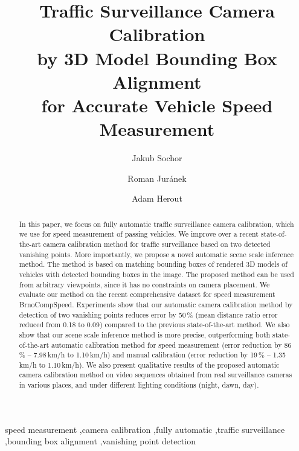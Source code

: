\documentclass[]{elsarticle}
\begin{document}
\begin{frontmatter}

\title{Traffic Surveillance Camera Calibration\\by 3D Model Bounding Box Alignment\\for Accurate Vehicle Speed Measurement}


\author[AddressIT4I]{Jakub Sochor}
\author[AddressIT4I]{Roman Juránek}
\author[AddressIT4I]{Adam Herout}
\address[AddressIT4I]{Brno University of Technology,
	Faculty of Information Technology,\\
	Centre of Excellence IT4Innovations,
	Božetěchova 2,
	612 66 Brno,
	Czech Republic
}


\begin{abstract}
In this paper, we focus on fully automatic traffic surveillance camera calibration, which we use for speed measurement of passing vehicles. We improve over a recent state-of-the-art camera calibration method for  traffic surveillance based on two detected vanishing points. More importantly, we propose a novel automatic scene scale inference method. The method is based on matching bounding boxes of rendered 3D models of vehicles with detected bounding boxes in the image. The proposed method can be used from arbitrary viewpoints, since it has no constraints on camera placement. 
We evaluate our method on the recent comprehensive dataset for speed measurement BrnoCompSpeed. Experiments show that our automatic camera calibration method by detection of two vanishing points reduces error by 50\,\% (mean distance ratio error reduced from 0.18 to 0.09) compared to the previous state-of-the-art method. We also show that our scene scale inference method is more precise, outperforming both state-of-the-art automatic calibration method for speed measurement (error reduction by 86\,\% -- 7.98\,km/h to 1.10\,km/h) and manual calibration (error reduction by 19\,\% -- 1.35\,km/h to 1.10\,km/h). 
We also present qualitative results of the proposed automatic camera calibration method on video sequences obtained from real surveillance cameras in various places, and under different lighting conditions (night, dawn, day).
\end{abstract}

\begin{keyword}
speed measurement \sep camera calibration \sep fully automatic \sep traffic surveillance \sep bounding box alignment \sep vanishing point detection
\end{keyword}



\end{frontmatter}
\end{document}
